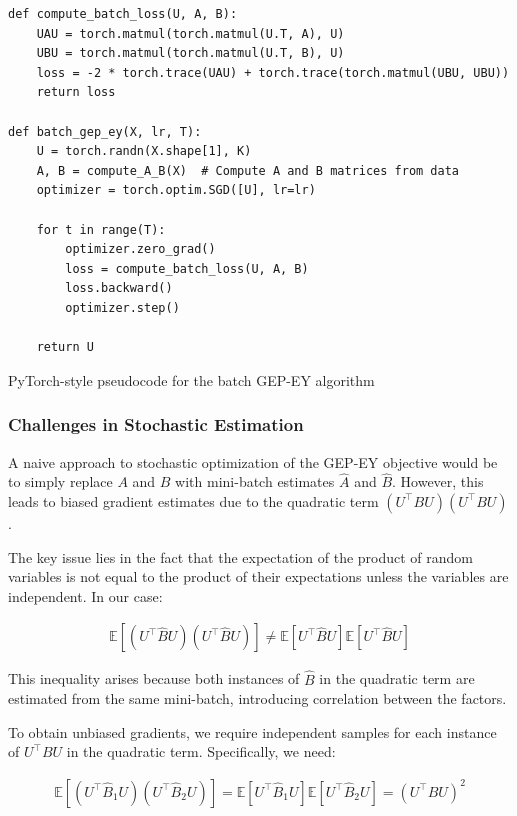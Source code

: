 \begin{listing}[ht]
\begin{verbatim}
def compute_batch_loss(U, A, B):
    UAU = torch.matmul(torch.matmul(U.T, A), U)
    UBU = torch.matmul(torch.matmul(U.T, B), U)
    loss = -2 * torch.trace(UAU) + torch.trace(torch.matmul(UBU, UBU))
    return loss

def batch_gep_ey(X, lr, T):
    U = torch.randn(X.shape[1], K)
    A, B = compute_A_B(X)  # Compute A and B matrices from data
    optimizer = torch.optim.SGD([U], lr=lr)
    
    for t in range(T):
        optimizer.zero_grad()
        loss = compute_batch_loss(U, A, B)
        loss.backward()
        optimizer.step()
    
    return U
\end{verbatim}
\caption{PyTorch-style pseudocode for the batch GEP-EY algorithm}
\label{lst:batch-gep-ey}
\end{listing}

\subsubsection{Challenges in Stochastic Estimation}

A naive approach to stochastic optimization of the GEP-EY objective would be to simply replace $A$ and $B$ with mini-batch estimates $\hat{A}$ and $\hat{B}$. However, this leads to biased gradient estimates due to the quadratic term $(U^\top B U)(U^\top B U)$. 

The key issue lies in the fact that the expectation of the product of random variables is not equal to the product of their expectations unless the variables are independent. In our case:

\begin{align}
\mathbb{E}[(U^\top \hat{B} U)(U^\top \hat{B} U)] \neq \mathbb{E}[U^\top \hat{B} U] \mathbb{E}[U^\top \hat{B} U]
\end{align}

This inequality arises because both instances of $\hat{B}$ in the quadratic term are estimated from the same mini-batch, introducing correlation between the factors.

To obtain unbiased gradients, we require independent samples for each instance of $U^\top B U$ in the quadratic term. Specifically, we need:

\begin{align}
\mathbb{E}[(U^\top \hat{B}_1 U)(U^\top \hat{B}_2 U)] = \mathbb{E}[U^\top \hat{B}_1 U] \mathbb{E}[U^\top \hat{B}_2 U] = (U^\top B U)^2
\end{align}


